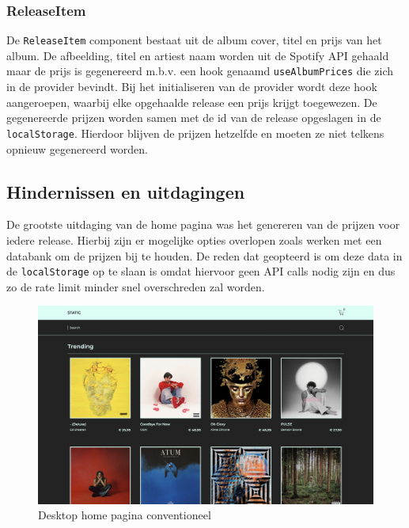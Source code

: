 \subsubsection{ReleaseItem}

De \texttt{ReleaseItem} component bestaat uit de album cover, titel en prijs van het album. De afbeelding, titel en artiest naam worden uit de Spotify API gehaald maar de prijs is gegenereerd m.b.v. een hook genaamd \texttt{useAlbumPrices} die zich in de provider bevindt. Bij het initialiseren van de provider wordt deze hook aangeroepen, waarbij elke opgehaalde release een prijs krijgt toegewezen. De gegenereerde prijzen worden samen met de id van de release opgeslagen in de \texttt{localStorage}. Hierdoor blijven de prijzen hetzelfde en moeten ze niet telkens opnieuw gegenereerd worden.

\subsection{Hindernissen en uitdagingen}

De grootste uitdaging van de home pagina was het genereren van de prijzen voor iedere release. Hierbij zijn er mogelijke opties overlopen zoals werken met een databank om de prijzen bij te houden. De reden dat geopteerd is om deze data in de \texttt{localStorage} op te slaan is omdat hiervoor geen API calls nodig zijn en dus zo de rate limit minder snel overschreden zal worden.

\begin{figure}[h]
	\centering
	\includegraphics[width=1\linewidth]{graphics/desktopHomeConventioneel}
	\caption[Desktop home pagina conventioneel]{Desktop home pagina conventioneel}
	\label{fig:desktopHomeConventioneel}
\end{figure}

